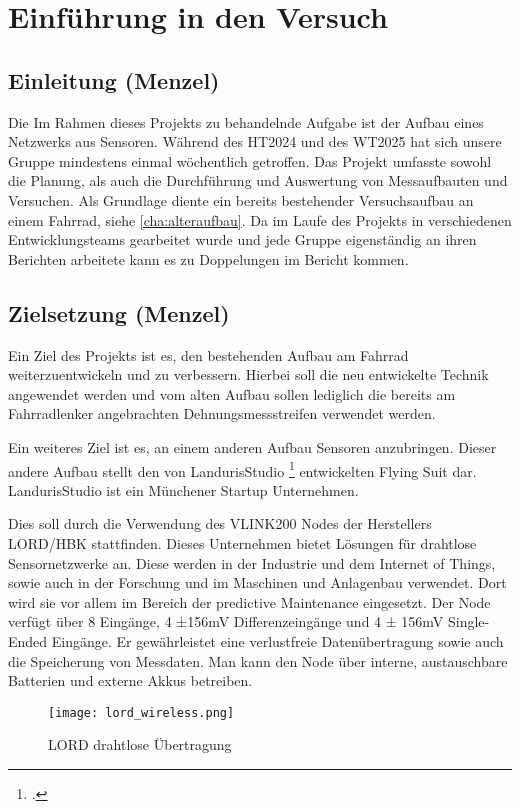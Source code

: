 \chapter{Einführung in den Versuch}
\label{cha:einfuehrung}
\todo{}
\section{Einleitung (Menzel)}

Die Im Rahmen dieses Projekts zu behandelnde Aufgabe ist der Aufbau eines Netzwerks aus Sensoren.
Während des HT2024 und des WT2025 hat sich unsere Gruppe mindestens einmal wöchentlich getroffen.
Das Projekt umfasste sowohl die Planung, als auch die Durchführung und Auswertung von Messaufbauten und Versuchen.
Als Grundlage diente ein bereits bestehender Versuchsaufbau an einem Fahrrad, siehe \ref{cha:alteraufbau}.
Da im Laufe des Projekts in verschiedenen Entwicklungsteams gearbeitet wurde und jede Gruppe eigenständig an ihren Berichten arbeitete kann es zu Doppelungen im Bericht kommen.

\section{Zielsetzung (Menzel)}
Ein Ziel des Projekts ist es, den bestehenden Aufbau am Fahrrad weiterzuentwickeln und zu verbessern.
Hierbei soll die neu entwickelte Technik angewendet werden und vom alten Aufbau sollen lediglich die bereits am Fahrradlenker angebrachten Dehnungsmessstreifen verwendet werden.

Ein weiteres Ziel ist es, an einem anderen Aufbau Sensoren anzubringen.
Dieser andere Aufbau stellt den von LandurisStudio \footcite{https://www.landuris.com/} entwickelten Flying Suit dar.
LandurisStudio ist ein Münchener Startup Unternehmen.

Dies soll durch die Verwendung des VLINK200 Nodes der Herstellers LORD/HBK stattfinden.
Dieses Unternehmen bietet Lösungen für drahtlose Sensornetzwerke an. Diese werden in der Industrie und dem Internet of Things, sowie auch in der Forschung und im Maschinen und Anlagenbau verwendet.
Dort wird sie vor allem im Bereich der predictive Maintenance eingesetzt.
Der Node verfügt über 8 Eingänge, 4 ±156mV Differenzeingänge und 4 ± 156mV Single-Ended Eingänge.
Er gewährleistet eine verlustfreie Datenübertragung sowie auch die Speicherung von Messdaten.
Man kann den Node über interne, austauschbare Batterien und externe Akkus betreiben.

\begin{figure}[h]
    \begin{center}
        \texttt{[image: lord\_wireless.png]}
        \caption[LORD drahtlose Übertragung (Abbildungsverzeichnis)]{LORD drahtlose Übertragung
        \cite{VLInkManual}
        }
        \label{fig:lordwireless}
    \end{center}
\end{figure}

